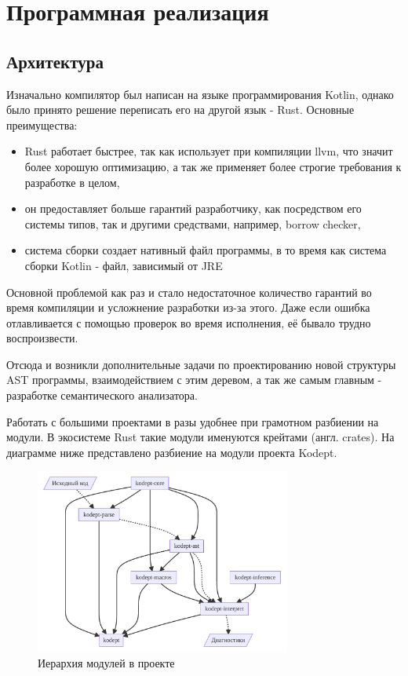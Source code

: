 \chapter{Программная реализация}
\label{ch:chap3_soft_architecture}
\section{Архитектура}
\label{sec:architecture}

Изначально компилятор был написан на языке программирования Kotlin, однако было принято решение переписать его на другой язык - Rust.
Основные преимущества:
\begin{itemize}
    \item Rust работает быстрее, так как использует при компиляции llvm, что значит более хорошую оптимизацию, а так же применяет более строгие требования к разработке в целом,
    \item он предоставляет больше гарантий разработчику, как посредством его системы типов, так и другими средствами, например, borrow checker,
    \item система сборки создает нативный файл программы, в то время как система сборки Kotlin - файл, зависимый от JRE
\end{itemize}

Основной проблемой как раз и стало недостаточное количество гарантий во время компиляции и усложнение разработки из-за этого.
Даже если ошибка отлавливается с помощью проверок во время исполнения, её бывало трудно воспроизвести.

Отсюда и возникли дополнительные задачи по проектированию новой структуры AST программы, взаимодействием с этим деревом, а так же самым главным - разработке семантического анализатора.

Работать с большими проектами в разы удобнее при грамотном разбиении на модули.
В экосистеме Rust такие модули именуются крейтами (англ. crates).
На диаграмме ниже представлено разбиение на модули проекта Kodept.

\begin{figure}[H]
    \centering
    \includegraphics[width=0.75\textwidth]{figures/modules}
    \caption{Иерархия модулей в проекте}
    \label{fig:modules}
\end{figure}


